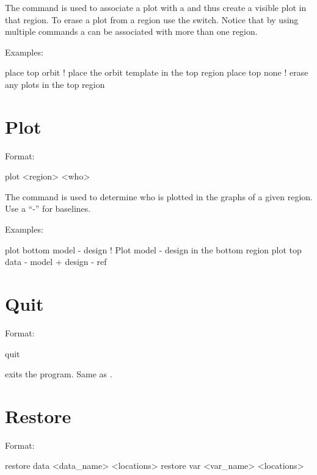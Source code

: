 \vskip 0.2in 
The  command is used to associate a  plot
with a  and thus create a visible plot in that region. To
erase a plot from a region use the  switch. Notice that by
using multiple  commands a  can be associated
with more than one region.

Examples:
\begin{example}
  place top orbit  ! place the orbit template in the top region
  place top none   ! erase any plots in the top region
\end{example}

\section{Plot}
\label{s:plot}

Format:
\begin{example}
  plot <region> <who>
\end{example}

\vskip 0.2in 
The  command is used to determine who is plotted
in the graphs of a given region. Use a ``-'' for baselines. 

Examples:
\begin{example}
  plot bottom model - design       ! Plot model - design in the bottom region
  plot top data - model + design - ref 
\end{example}

\section{Quit}
\label{s:quit}

Format:
\begin{example}
  quit
\end{example}

\vskip 0.2in
 exits the program. Same as .

\section{Restore}
\label{s:restore}

Format:
\begin{example}
  restore data  <data_name> <locations>
  restore var <var_name> <locations>
\end{example}

